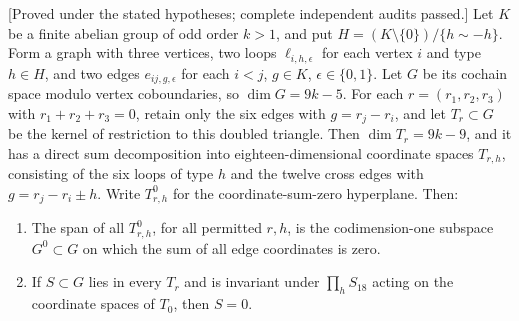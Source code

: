 \begin{lemma}
\label{lem:three-theta-odd-labelled-graph-candidate}
\textup{[Proved under the stated hypotheses; complete independent audits passed.]}
Let $K$ be a finite abelian group of odd order $k>1$, and put
$H=(K\setminus\{0\})/\{h\sim-h\}$. Form a graph with three vertices,
two loops $\ell_{i,h,\epsilon}$ for each vertex $i$ and type $h\in H$,
and two edges $e_{ij,g,\epsilon}$ for each $i<j$, $g\in K$,
$\epsilon\in\{0,1\}$. Let $G$ be its cochain space modulo vertex
coboundaries, so $\dim G=9k-5$.
For each $r=(r_1,r_2,r_3)$ with $r_1+r_2+r_3=0$, retain only the
six edges with $g=r_j-r_i$, and let $T_r\subset G$ be the kernel
of restriction to this doubled triangle. Then $\dim T_r=9k-9$,
and it has a direct sum decomposition into eighteen-dimensional
coordinate spaces $T_{r,h}$, consisting of the six loops of type
$h$ and the twelve cross edges with $g=r_j-r_i\pm h$.
Write $T_{r,h}^0$ for the coordinate-sum-zero hyperplane.
Then:
\begin{enumerate}
\item The span of all $T_{r,h}^0$, for all permitted $r,h$, is the
codimension-one subspace $G^0\subset G$ on which the sum of all edge
coordinates is zero.
\item If $S\subset G$ lies in every $T_r$ and is invariant under
$\prod_h S_{18}$ acting on the coordinate spaces of $T_0$, then $S=0$.
\end{enumerate}
\end{lemma}
